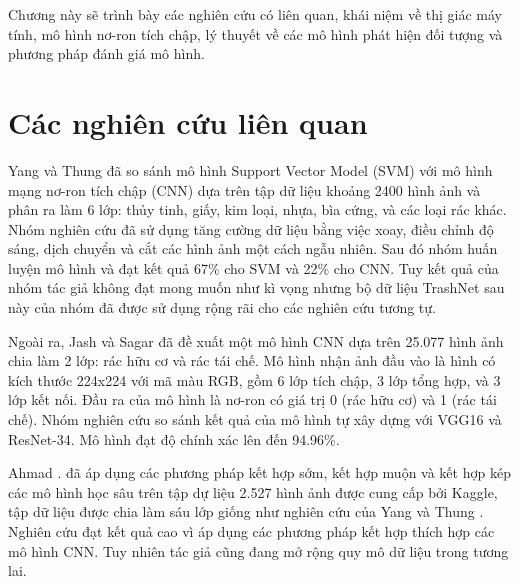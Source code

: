 \documentclass[../the.tex]{subfiles}
\begin{document}
{\fontsize{13}{12} \selectfont

Chương này sẽ trình bày các nghiên cứu có liên quan, khái niệm về thị giác máy tính, mô hình nơ-ron tích chập, lý thuyết về các mô hình phát hiện đối tượng và phương pháp đánh giá mô hình.

}

\section{Các nghiên cứu liên quan}
\label{sec:nnlq}
{\fontsize{13}{12} \selectfont

	Yang và Thung \cite{yang2016classification} đã so sánh mô hình Support Vector Model (SVM) với
	mô hình mạng nơ-ron tích chập (CNN) dựa trên tập dữ liệu khoảng 2400 hình
	ảnh và phân ra làm 6 lớp: thủy tinh, giấy, kim loại, nhựa, bìa cứng, và các loại
	rác khác. Nhóm nghiên cứu đã sử dụng tăng cường dữ liệu bằng việc xoay, điều chỉnh độ sáng,
	dịch chuyển và cắt các hình ảnh một cách ngẫu nhiên. Sau đó nhóm huấn luyện mô hình và đạt kết quả 67\% cho SVM và 22\% cho CNN.
	Tuy kết quả của nhóm tác giả không đạt mong muốn như kì vọng nhưng bộ dữ liệu TrashNet sau này của nhóm đã được sử
	dụng rộng rãi cho các nghiên cứu tương tự.

}

\bigskip

{\fontsize{13}{12} \selectfont

	Ngoài ra, Jash và Sagar \cite{shah2022method} đã đề xuất một mô hình CNN dựa trên 25.077
	hình ảnh chia làm 2 lớp: rác hữu cơ và rác tái chế. Mô hình nhận ảnh đầu vào là
	hình có kích thước 224x224 với mã màu RGB, gồm 6 lớp tích chập, 3 lớp tổng
	hợp, và 3 lớp kết nối. Đầu ra của mô hình là nơ-ron
	có giá trị 0 (rác hữu cơ) và 1 (rác tái chế). Nhóm nghiên cứu so sánh kết quả
	của mô hình tự xây dựng với VGG16 \cite{simonyan2014very} và ResNet-34.
	Mô hình đạt độ chính xác lên đến 94.96\%.

}

\bigskip

{\fontsize{13}{12} \selectfont

	Ahmad \etal. \cite{ahmad2020intelligent} đã áp dụng các phương pháp kết hợp sớm, kết hợp muộn
	và kết hợp kép các mô hình học sâu trên tập dự liệu 2.527 hình ảnh được cung cấp bởi Kaggle, tập dữ liệu
	được chia làm sáu lớp giống như nghiên cứu của Yang và Thung \cite{yang2016classification}.
	Nghiên cứu đạt kết quả cao vì áp dụng các phương pháp kết hợp thích hợp các mô hình CNN.
	Tuy nhiên tác giả cũng đang mở rộng
	quy mô dữ liệu trong tương lai.

}
\end{document}
